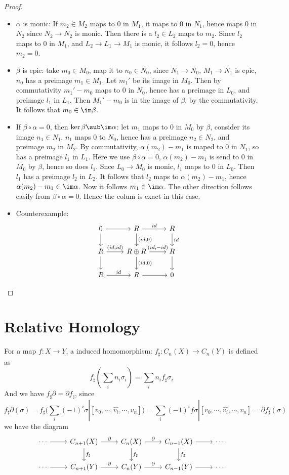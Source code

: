 \begin{proof}
\mbox{}
\begin{itemize}
\item $\alpha$ is monic: If $m_2\in M_2$ maps to $0$ in $M_1$, it maps to $0$ in $N_1$, hence maps $0$ in $N_2$ since $N_2\to N_2$ is monic. Then there is a $l_2\in L_2$ maps to $m_2$. Since $l_2$ maps to $0$ in $M_1$, and $L_2\to L_1\to M_1$ is monic, it follows $l_2=0$, hence $m_2=0$.
\item $\beta$ is epic: take $m_0\in M_0$, map it to $n_0\in N_0$, since $N_1\to N_0$, $M_1\to N_1$ is epic, $n_0$ has a preimage $m_1\in M_1$. Let $m_1'$ be its image in $M_0$. Then by commutativity $m_1'-m_0$ maps to $0$ in $N_0$, hence has a preimage in $L_0$, and preimage $l_1$ in $L_1$. Then $M_1'-m_0$ is in the image of $\beta$, by the commutativity. It follows that $m_0\in\im\beta$.
\item If $\beta\circ\alpha=0$, then $\ker\beta\sub\im\alpha$: let $m_1$ maps to $0$ in $M_0$ by $\beta$, consider its image $n_1\in N_1$. $n_1$ maps $0$ to $N_0$, hence has a preimage $n_2\in N_2$, and preimage $m_2$ in $M_2$. By commutativity, $\alpha(m_2)-m_1$ is maped to $0$ in $N_1$, so has a preimage $l_1$ in $L_1$. Here we use $\beta\circ\alpha=0$, $\alpha(m_2)-m_1$ is send to $0$ in $M_0$ by $\beta$, hence so does $l_1$. Snce $L_0\to M_0$ is monic, $l_1$ maps to $0$ in $L_0$. Then $l_1$ has a preimage $l_2$ in $L_2$. It follows that $l_2$ maps to $\alpha(m_2)-m_1$, hence $\alpha(m_2)-m_1\in\im\alpha$. Now it follows $m_1\in\im\alpha$. The other direction follows easily from $\beta\circ\alpha=0$. Hence the colum is exact in this case.
\item Counterexample:
\[\begin{tikzcd}
0\ar[d]\ar[r]&R\ar[d,"{(id,0)}"]\ar[r,"id"]&R\ar[d,"id"]\\
R\ar[d]\ar[r,"{(id,id)}"]&R\oplus R\ar[d,"{(id,0)}"]\ar[r,"{(id,-id)}"]&R\ar[d]\\
R\ar[r,"id"]&R\ar[r]&0
\end{tikzcd}\]
\end{itemize}
\end{proof}
\section{Relative Homology}
For a map $f:X\to Y$, a induced homomorphism: $f_\sharp:C_n(X)\to C_n(Y)$ is defined as
\[f_\sharp(\sum_i n_i\sigma_i)=\sum_i n_if_\sharp\sigma_i\]
And we have $f_\sharp\partial=\partial f_\sharp$, since
\[f_\sharp\partial(\sigma)=f_\sharp(\sum_i (-1)^{i}\sigma|[v_0,\cdots,\hat{v_i},\cdots,v_n])=\sum_i(-1)^if\sigma|[v_0,\cdots,\hat{v_i},\cdots,v_n]=\partial f_\sharp(\sigma)\]
we have the diagram
\[\begin{tikzcd}
\cdots\arrow{r} 
&C_{n+1}(X)\arrow[r,"\partial"] \arrow[d,"f_\sharp"]
&C_n(X)\arrow[r,"\partial"]\arrow[d,"f_\sharp"]
&C_{n-1}(X)\arrow[r]\arrow[d,"f_\sharp"]
&\cdots\\
\cdots\arrow[r]
&C_{n+1}(Y)\arrow[r,"\partial"] 
&C_n(Y)\arrow[r,"\partial"]
&C_{n-1}(Y)\arrow[r] 
&\cdots
\end{tikzcd}
\]

